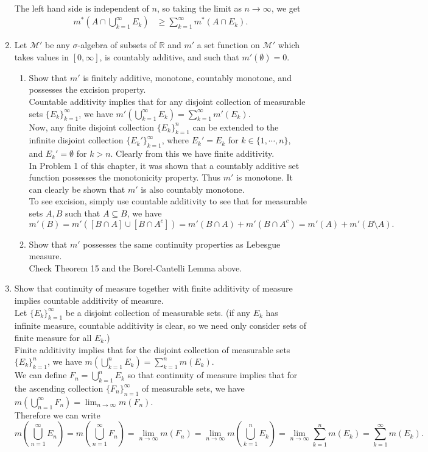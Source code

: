 \begin{enumerate}
\begin{align*}
	\end{align*}
	The left hand side is independent of $n$, so taking the limit as $n\to\infty$, we get
	\begin{align*}
		m^*(A\cap\bigcup_{k=1}^\infty E_k)&\ge \sum_{k=1}^\infty m^*(A\cap E_k).
	\end{align*}
	\item Let $\mathcal{M}'$ be any $\sigma$-algebra of subsets of $\mathbb{R}$ and $m'$ a set function on $\mathcal{M}'$ which takes values in $[0,\infty]$, is countably additive, and such that $m'(\emptyset)=0$.
	\begin{enumerate}[label=(\roman*),align=left]
		\item Show that $m'$ is finitely additive, monotone, countably monotone, and possesses the excision property.\\
		Countable additivity implies that for any disjoint collection of measurable sets $\{E_k\}_{k=1}^\infty$, we have $m'(\bigcup_{k=1}^\infty E_k)=\sum_{k=1}^\infty m'(E_k)$.\\
		Now, any finite disjoint collection $\{E_k\}_{k=1}^n$ can be extended to the infinite disjoint collection $\{E_k'\}_{k=1}^\infty$, where $E_k'=E_k$ for $k\in\{1,\cdots,n\}$, and $E_k'=\emptyset$ for $k>n$.
		Clearly from this we have finite additivity.\\
		In Problem 1 of this chapter, it was shown that a countably additive set function possesses the monotonicity property.
		Thus $m'$ is monotone. It can clearly be shown that $m'$ is also countably monotone.\\
		To see excision, simply use countable additivity to see that for measurable sets $A,B$ such that $A\subseteq B$, we have
		\[
			m'(B) = m'([B\cap A]\cup[B\cap A^c])=m'(B\cap A)+m'(B\cap A^c)=m'(A)+m'(B\setminus A).
		\]
		\item Show that $m'$ possesses the same continuity properties as Lebesgue measure.\\
		Check Theorem 15 and the Borel-Cantelli Lemma above.
	\end{enumerate}
	\item Show that continuity of measure together with finite additivity of measure implies countable additivity of measure.\\
	Let $\{E_k\}_{k=1}^\infty$ be a disjoint collection of measurable sets. (if any $E_k$ has infinite measure, countable additivity is clear, so we need only consider sets of finite measure for all $E_k$.)\\
	Finite additivity implies that for the disjoint collection of measurable sets $\{E_k\}_{k=1}^n$, we have $m(\bigcup_{k=1}^n E_k)=\sum_{k=1}^n m(E_k)$.\\
	We can define $F_n=\bigcup_{k=1}^n E_k$ so that continuity of measure implies that for the ascending collection $\{F_n\}_{n=1}^\infty$ of measurable sets, we have $m(\bigcup_{n=1}^\infty F_n)=\lim_{n\to\infty}m(F_n)$.\\
	Therefore we can write
	\[
		m(\bigcup_{n=1}^\infty E_n)=m(\bigcup_{n=1}^\infty F_n)=\lim_{n\to\infty}m(F_n)=\lim_{n\to\infty}m(\bigcup_{k=1}^n E_k)=\lim_{n\to\infty}\sum_{k=1}^n m(E_k)=\sum_{k=1}^\infty m(E_k).
	\]
\end{enumerate}

